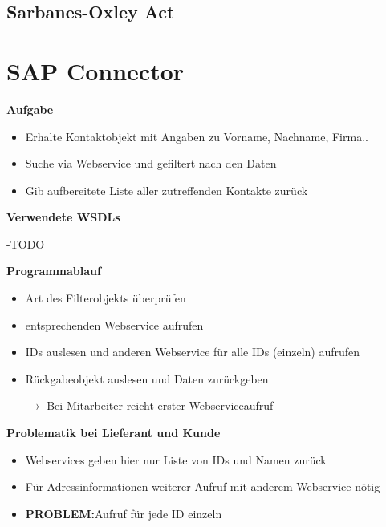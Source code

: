 \documentclass[xcolor={usenames,dvipsnames}, compress, 10pt]{beamer}
\begin{document}
\subsection*{Sarbanes-Oxley Act}

\section{SAP Connector}

\begin{frame}
\textbf{Aufgabe}
\begin{center}

\begin{itemize}
\item Erhalte Kontaktobjekt mit Angaben zu Vorname, Nachname, Firma..
\item Suche via Webservice und gefiltert nach den Daten 
\item Gib aufbereitete Liste aller zutreffenden Kontakte zurück
\end{itemize}

\end{center}
\end{frame}


\begin{frame}
\textbf{Verwendete WSDLs}
\begin{center}


-TODO


\end{center}
\end{frame}


\begin{frame}
\textbf{Programmablauf}
\begin{center}

\begin{itemize}
\item Art des Filterobjekts überprüfen
\item entsprechenden Webservice aufrufen
\item IDs auslesen und anderen Webservice für alle IDs (einzeln) aufrufen
\item Rückgabeobjekt auslesen und Daten zurückgeben
\item[$\rightarrow$]Bei Mitarbeiter reicht erster Webserviceaufruf

\end{itemize}

\end{center}
\end{frame}

\begin{frame}
\textbf{Problematik bei Lieferant und Kunde}
\begin{center}

\begin{itemize}
\item Webservices geben hier nur Liste von IDs und Namen zurück
\item Für Adressinformationen weiterer Aufruf mit anderem Webservice nötig
\item \textbf{PROBLEM:}Aufruf für jede ID einzeln
\end{itemize}

\end{center}
\end{frame}
\end{document}
